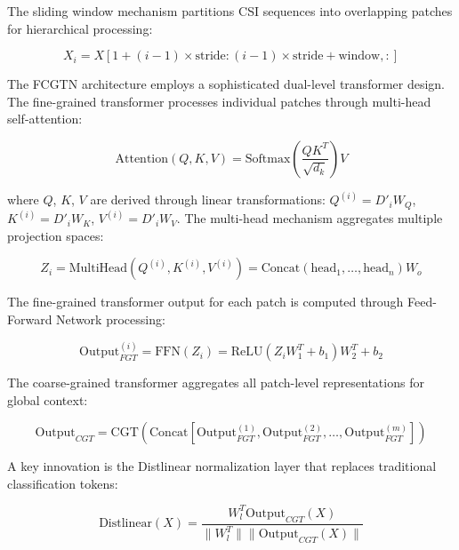 \documentclass[journal]{IEEEtran}
\begin{document}
The sliding window mechanism partitions CSI sequences into overlapping patches for hierarchical processing:

\begin{equation}
X_i = X[1 + (i-1) \times \text{stride} : (i-1) \times \text{stride} + \text{window}, :]
\label{eq:cdfi_sliding_window}
\end{equation}

The FCGTN architecture employs a sophisticated dual-level transformer design. The fine-grained transformer processes individual patches through multi-head self-attention:

\begin{equation}
\text{Attention}(Q, K, V) = \text{Softmax}\left(\frac{QK^T}{\sqrt{d_k}}\right)V
\label{eq:cdfi_attention}
\end{equation}

where $Q$, $K$, $V$ are derived through linear transformations: $Q^{(i)} = D'_i W_Q$, $K^{(i)} = D'_i W_K$, $V^{(i)} = D'_i W_V$. The multi-head mechanism aggregates multiple projection spaces:

\begin{equation}
Z_i = \text{MultiHead}(Q^{(i)}, K^{(i)}, V^{(i)}) = \text{Concat}(\text{head}_1, \ldots, \text{head}_n)W_o
\label{eq:cdfi_multihead}
\end{equation}

The fine-grained transformer output for each patch is computed through Feed-Forward Network processing:

\begin{equation}
\text{Output}^{(i)}_{FGT} = \text{FFN}(Z_i) = \text{ReLU}(Z_i W_1^T + b_1) W_2^T + b_2
\label{eq:cdfi_fgt_output}
\end{equation}

The coarse-grained transformer aggregates all patch-level representations for global context:

\begin{equation}
\text{Output}_{CGT} = \text{CGT}(\text{Concat}[\text{Output}^{(1)}_{FGT}, \text{Output}^{(2)}_{FGT}, \ldots, \text{Output}^{(m)}_{FGT}])
\label{eq:cdfi_cgt_output}
\end{equation}

A key innovation is the Distlinear normalization layer that replaces traditional classification tokens:

\begin{equation}
\text{Distlinear}(X) = \frac{W_l^T \text{Output}_{CGT}(X)}{\|W_l^T\| \|\text{Output}_{CGT}(X)\|}
\label{eq:cdfi_distlinear}
\end{equation}
\end{document}

